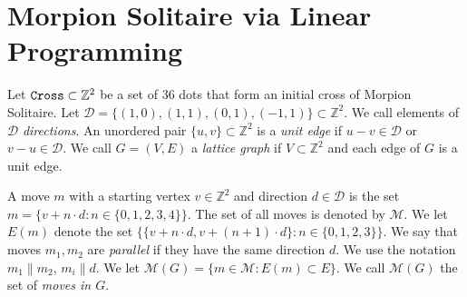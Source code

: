 
\newcommand{\D}{\mathcal{D}}
\renewcommand{\ord}{\operatorname{ord}}
\newcommand{\mv}{\operatorname{mv}}
\renewcommand{\dt}{\operatorname{dt}}
\renewcommand{\L}[1]{{\sffamily L\textsubscript{#1}}}

\section{Morpion Solitaire via Linear Programming}
\label{sec:linear}

Let $\texttt{Cross} \subset \mathbb{Z}^2$ be a set of $36$ dots that form an initial cross of Morpion Solitaire.
Let $\D = \{ (1, 0), (1,1), (0,1), (-1,1) \} \subset \mathbb{Z}^2$. We call elements of $\D$ \emph{directions}.
An unordered pair $\{ u, v \} \subset \mathbb{Z}^2$ is a \emph{unit edge} if $u - v \in \D$ or $v - u \in \D$.
We call $G = (V, E)$  a \emph{lattice graph} if $V \subset \mathbb{Z}^2$
      and each edge of $G$ is a unit edge.




A move $m$ with a starting vertex $v \in \mathbb{Z}^2$ and direction $d \in \D$ is the set
$
   m = \{ v + n \cdot d \colon n \in \{ 0, 1, 2, 3, 4 \} \}.
$
The set of all moves is denoted by $\mathcal{M}$. We let $E(m)$ denote the set $\{ \{ v + n \cdot d, v + (n+1) \cdot d \} \colon n \in \{0, 1, 2, 3 \} \}$.
We say that moves $m_1,m_2$ are \emph{parallel} if they have the same direction $d$. We use the notation $m_1 \parallel m_2$, $m_i \parallel d$.  
    We let
    $
      \mathcal{M}(G) = \{ m \in \mathcal{M} \colon E(m) \subset E \}
    $.
     We call $\mathcal{M}(G)$ the set of \emph{moves in $G$}.


